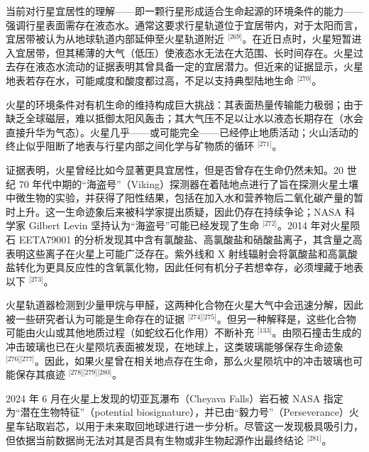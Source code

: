 当前对行星宜居性的理解——即一颗行星形成适合生命起源的环境条件的能力——强调行星表面需存在液态水。通常这要求行星轨道位于宜居带内，对于太阳而言，宜居带被认为从地球轨道内部延伸至火星轨道附近 \(^{\text{[269]}}\)。在近日点时，火星短暂进入宜居带，但其稀薄的大气（低压）使液态水无法在大范围、长时间存在。火星过去存在液态水流动的证据表明其曾具备一定的宜居潜力。但近来的证据显示，火星地表若存在水，可能咸度和酸度都过高，不足以支持典型陆地生命 \(^{\text{[270]}}\)。

火星的环境条件对有机生命的维持构成巨大挑战：其表面热量传输能力极弱；由于缺乏全球磁层，难以抵御太阳风轰击；其大气压不足以让水以液态长期存在（水会直接升华为气态）。火星几乎——或可能完全——已经停止地质活动；火山活动的终止似乎阻断了地表与行星内部之间化学与矿物质的循环 \(^{\text{[271]}}\)。

证据表明，火星曾经比如今显著更具宜居性，但是否曾存在生命仍然未知。20 世纪 70 年代中期的“海盗号”（Viking）探测器在着陆地点进行了旨在探测火星土壤中微生物的实验，并获得了阳性结果，包括在加入水和营养物后二氧化碳产量的暂时上升。这一生命迹象后来被科学家提出质疑，因此仍存在持续争论；NASA 科学家 Gilbert Levin 坚持认为“海盗号”可能已经发现了生命 \(^{\text{[272]}}\)。2014 年对火星陨石 EETA79001 的分析发现其中含有氯酸盐、高氯酸盐和硝酸盐离子，其含量之高表明这些离子在火星上可能广泛存在。紫外线和 X 射线辐射会将氯酸盐和高氯酸盐转化为更具反应性的含氧氯化物，因此任何有机分子若想幸存，必须埋藏于地表以下 \(^{\text{[273]}}\)。

火星轨道器检测到少量甲烷与甲醛，这两种化合物在火星大气中会迅速分解，因此被一些研究者认为可能是生命存在的证据 \(^{\text{[274][275]}}\)。但另一种解释是，这些化合物可能由火山或其他地质过程（如蛇纹石化作用）不断补充 \(^{\text{[133]}}\)。由陨石撞击生成的冲击玻璃也已在火星陨坑表面被发现，在地球上，这类玻璃能够保存生命迹象 \(^{\text{[276][277]}}\)。因此，如果火星曾在相关地点存在生命，那么火星陨坑中的冲击玻璃也可能保存其痕迹 \(^{\text{[278][279][280]}}\)。

2024 年 6 月在火星上发现的切亚瓦瀑布（Cheyava Falls）岩石被 NASA 指定为“潜在生物特征”（potential biosignature），并已由“毅力号”（Perseverance）火星车钻取岩芯，以用于未来取回地球进行进一步分析。尽管这一发现极具吸引力，但依据当前数据尚无法对其是否具有生物或非生物起源作出最终结论 \(^{\text{[281]}}\)。
